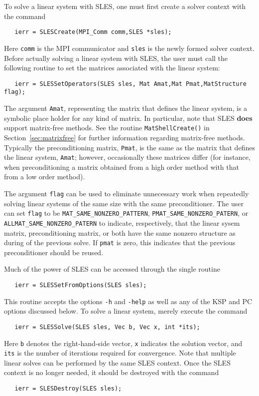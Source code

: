 To solve a linear system with SLES, one must first create a solver context 
with the command 
\begin{verbatim}
   ierr = SLESCreate(MPI_Comm comm,SLES *sles); 
\end{verbatim}
Here {\tt comm} is the MPI communicator and {\tt sles} is the newly
formed solver context.
Before actually solving a linear system with SLES, the user must call 
the following routine to set the matrices associated with the linear
system: 
\begin{verbatim}
   ierr = SLESSetOperators(SLES sles, Mat Amat,Mat Pmat,MatStructure flag);
\end{verbatim}
The argument {\tt Amat}, representing the matrix that defines the
linear system, is a symbolic place holder for any kind of matrix.  
In particular, note that SLES {\bf does} support matrix-free methods. 
See 
the routine {\tt MatShellCreate()} 
in Section~\ref{sec:matrixfree} for further information regarding
matrix-free methods. 
Typically the preconditioning matrix, {\tt Pmat}, is the same as
the matrix that defines the linear system, {\tt Amat}; however,
occasionally these matrices differ (for instance, 
when preconditioning a matrix obtained from a high order method with 
that from a low order method).

The argument {\tt flag} can be used to eliminate unnecessary work when
repeatedly solving linear systems of the same size with the same 
preconditioner.  The user can set {\tt flag} to be
{\tt MAT\_SAME\_NONZERO\_PATTERN}, {\tt PMAT\_SAME\_NONZERO\_PATERN},
or {\tt ALLMAT\_SAME\_NONZERO\_PATERN} to indicate, respectively, that 
the linear sysem matrix, preconditioning matrix, or both have the same 
  
nonzero structure as during of the previous solve. If {\tt pmat} is zero,
this indicates that the previous preconditioner should be reused.
 
Much of the power of SLES can be accessed through the single routine
\begin{verbatim}
   ierr = SLESSetFromOptions(SLES sles);
\end{verbatim}
This 
routine accepts the options {\tt -h} and {\tt -help} as well as 
any of the KSP and PC options discussed below. 
To solve a linear system, merely execute the command 
\begin{verbatim}
   ierr = SLESSolve(SLES sles, Vec b, Vec x, int *its);
\end{verbatim}
Here {\tt b} denotes the right-hand-side vector, {\tt x} indicates
the solution vector, and {\tt its} is the number of iterations 
required for convergence.
Note that multiple linear solves can be performed by the same SLES context.
Once the SLES context is no longer needed, it should be destroyed with the 
command 
\begin{verbatim}
   ierr = SLESDestroy(SLES sles);
\end{verbatim}

